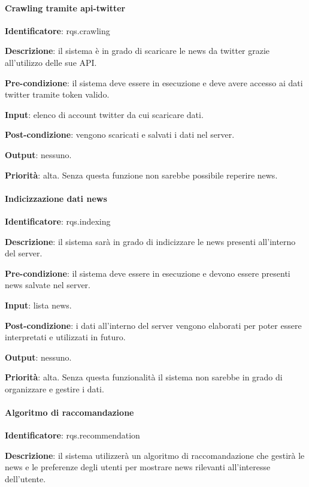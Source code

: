 \documentclass[12pt]{article}
\begin{document}
\paragraph{Crawling tramite api-twitter}

\textbf{Identificatore}: rqs.crawling

\textbf{Descrizione}: il sistema è in grado di scaricare le news da twitter grazie all'utilizzo delle sue API.

\textbf{Pre-condizione}: il sistema deve essere in esecuzione e deve avere accesso ai dati twitter tramite token valido.

\textbf{Input}: elenco di account twitter da cui scaricare dati.

\textbf{Post-condizione}: vengono scaricati e salvati i dati nel server.

\textbf{Output}: nessuno.

\textbf{Priorità}: alta. Senza questa funzione non sarebbe possibile reperire news.

\paragraph{Indicizzazione dati news}

\textbf{Identificatore}: rqs.indexing

\textbf{Descrizione}: il sistema sarà in grado di indicizzare le news presenti all'interno del server.

\textbf{Pre-condizione}: il sistema deve essere in esecuzione e devono essere presenti news salvate nel server.

\textbf{Input}: lista news.

\textbf{Post-condizione}: i dati all'interno del server vengono elaborati per poter essere interpretati e utilizzati in futuro.

\textbf{Output}: nessuno.

\textbf{Priorità}: alta. Senza questa funzionalità il sistema non sarebbe in grado di organizzare e gestire i dati.

\paragraph{Algoritmo di raccomandazione}

\textbf{Identificatore}: rqs.recommendation

\textbf{Descrizione}: il sistema utilizzerà un algoritmo di raccomandazione che gestirà le news e le preferenze degli utenti per mostrare news rilevanti all'interesse dell'utente.
\end{document}

